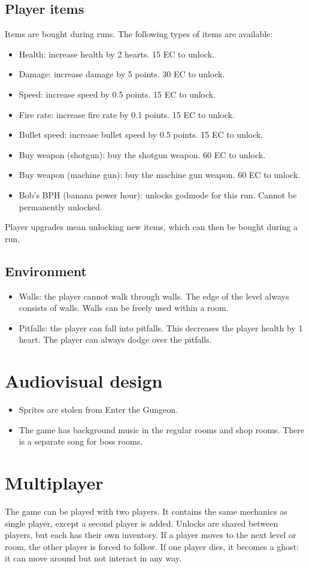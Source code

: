 \documentclass{article}
\begin{document}
\subsection{Player items}
Items are bought during runs. The following types of items are available:
\begin{itemize}
    \item Health: increase health by 2 hearts. 15 EC to unlock.
    \item Damage: increase damage by 5 points. 30 EC to unlock.
    \item Speed: increase speed by 0.5 points. 15 EC to unlock.
    \item Fire rate: increase fire rate by 0.1 points. 15 EC to unlock.
    \item Bullet speed: increase bullet speed by 0.5 points. 15 EC to unlock.
    \item Buy weapon (shotgun): buy the shotgun weapon. 60 EC to unlock.
    \item Buy weapon (machine gun): buy the machine gun weapon. 60 EC to unlock.
    \item Bob's BPH (banana power hour): unlocks godmode for this run. Cannot be permanently unlocked.
\end{itemize}

Player upgrades mean unlocking new items, which can then be bought during a run.

\subsection{Environment}
\begin{itemize}
    \item Walls: the player cannot walk through walls. The edge of the level always consists of walls. Walls can be freely used within a room.
    \item Pitfalls: the player can fall into pitfalls. This decreases the player health by 1 heart. The player can always dodge over the pitfalls.
\end{itemize}

\section{Audiovisual design}
\begin{itemize}
    \item Sprites are stolen from Enter the Gungeon.
    \item The game has background music in the regular rooms and shop rooms. There is a separate song for boss rooms.
\end{itemize}

\section{Multiplayer}
The game can be played with two players. It contains the same mechanics as single player, except a second player is added.
Unlocks are shared between players, but each has their own inventory.
If a player moves to the next level or room, the other player is forced to follow.
If one player dies, it becomes a ghost: it can move around but not interact in any way.
\end{document}
